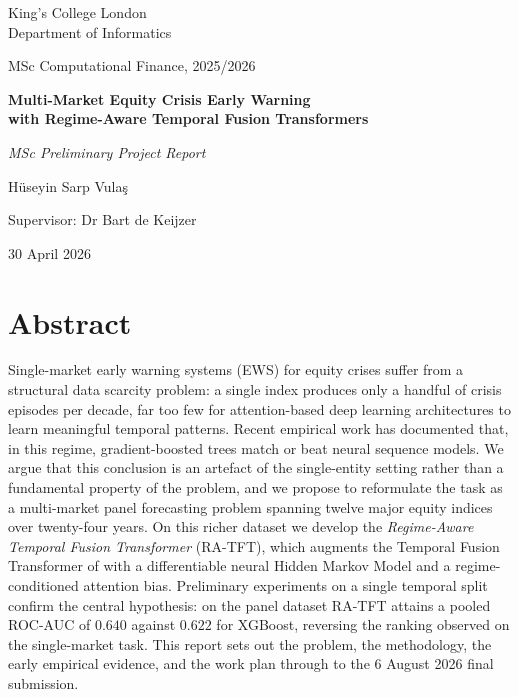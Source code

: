 \documentclass[11pt,a4paper]{article}
\begin{document}
\begin{titlepage}
\centering
\vspace*{2.5cm}
{\large King's College London \\ Department of Informatics \par}
\vspace{0.4cm}
{\large MSc Computational Finance, 2025/2026 \par}
\vfill
{\Large\bfseries Multi-Market Equity Crisis Early Warning \\[4pt]
with Regime-Aware Temporal Fusion Transformers \par}
\vspace{0.6cm}
{\itshape MSc Preliminary Project Report \par}
\vfill
{\large Hüseyin Sarp Vulaş \par}
\vspace{0.2cm}
{\normalsize Supervisor: Dr Bart de Keijzer \par}
\vfill
{\normalsize 30 April 2026 \par}
\vspace{1cm}
\end{titlepage}


\section*{Abstract}
\noindent
Single-market early warning systems (EWS) for equity crises suffer from a
structural data scarcity problem: a single index produces only a handful of
crisis episodes per decade, far too few for attention-based deep learning
architectures to learn meaningful temporal patterns. Recent empirical work has
documented that, in this regime, gradient-boosted trees match or beat
neural sequence models. We argue that this conclusion is an artefact of the
single-entity setting rather than a fundamental property of the problem, and
we propose to reformulate the task as a multi-market panel forecasting problem
spanning twelve major equity indices over twenty-four years.
On this richer dataset we develop the \emph{Regime-Aware Temporal Fusion
Transformer} (RA-TFT), which augments the Temporal Fusion Transformer of
\citet{lim2021tft} with a differentiable neural Hidden Markov Model and a
regime-conditioned attention bias. Preliminary experiments on a single
temporal split confirm the central hypothesis: on the panel dataset RA-TFT
attains a pooled ROC-AUC of $0.640$ against $0.622$ for XGBoost, reversing
the ranking observed on the single-market task. This report sets out the
problem, the methodology, the early empirical evidence, and the work plan
through to the 6 August 2026 final submission.
\end{document}
